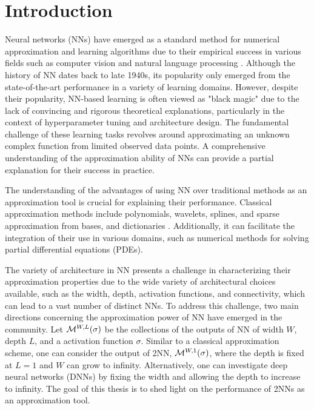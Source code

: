 \chapter{Introduction}
\label{ch:introduction}


Neural networks (NNs) have emerged as a standard method for numerical
approximation and learning algorithms due to their empirical success in various
fields such as computer vision and natural language processing
\citep{shalev-shwartzUnderstandingMachineLearning2014}. Although the history of
NN dates back to late 1940s, its popularity only emerged from the
state-of-the-art performance in a variety of learning domains. However, despite
their popularity, NN-based learning is often viewed as "black magic" due to the
lack of convincing and rigorous theoretical explanations, particularly in the
context of hyperparameter tuning and architecture design. The fundamental
challenge of these learning tasks revolves around approximating an unknown
complex function from limited observed data points. A comprehensive
understanding of the approximation ability of NNs can provide a partial
explanation for their success in practice.


The understanding of the advantages of using NN over traditional methods as an
approximation tool is crucial for explaining their performance. Classical
approximation methods include polynomials, wavelets, splines, and sparse
approximation from bases, and dictionaries \citep{devore_1998}. Additionally, it
can facilitate the integration of their use in various domains, such as
numerical methods for solving partial differential equations (PDEs).


The variety of architecture in NN presents a challenge in characterizing their
approximation properties due to the wide variety of architectural choices
available, such as the width, depth, activation functions, and connectivity,
which can lead to a vast number of distinct NNs. To address this challenge, two
main directions concerning the approximation power of NN have emerged in the
community. Let $\mathcal{M}^{ {W}, {L} }( {\sigma} )$ be the collections of the outputs of NN
of width $W$, depth $L$, and a activation function $\sigma$. Similar to a
classical approximation scheme, one can consider the output of 2NN,
$\mathcal{M}^{ {W}, {1} }( {\sigma} )$, where the depth is fixed at $L=1$ and $W$ can grow to
infinity. Alternatively, one can investigate deep neural networks (DNNs) by
fixing the width and allowing the depth to increase to infinity. The goal of
this thesis is to shed light on the performance of 2NNs as an approximation
tool.

